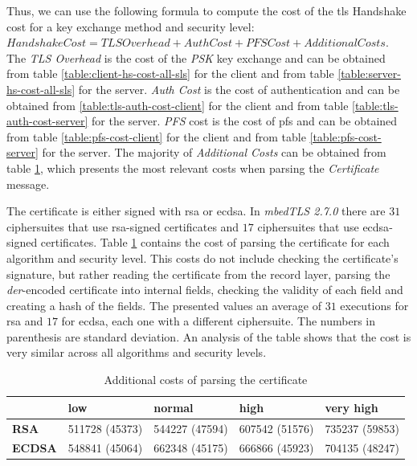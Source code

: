 \documentclass{llncs}
\begin{document}
Thus, we can use the following formula to compute the cost of the \gls{tls} Handshake cost for a key exchange method and
security level: $Handshake Cost = TLS Overhead + Auth Cost + PFS Cost + Additional Costs$. The \textit{TLS Overhead} is the cost of the
\textit{PSK} key exchange and can be obtained from table \ref{table:client-hs-cost-all-sls} for the client
and from table \ref{table:server-hs-cost-all-sls} for the server. \textit{Auth Cost} is the cost of authentication and can be obtained
from \ref{table:tls-auth-cost-client} for the client and from table \ref{table:tls-auth-cost-server} for the server. \textit{PFS} cost
is the cost of \gls{pfs} and can be obtained from table \ref{table:pfs-cost-client} for the client and from table \ref{table:pfs-cost-server}
for the server. The majority of \textit{Additional Costs} can be obtained from table \ref{table:cert-parse-cost}, which presents the most relevant
costs when parsing the \textit{Certificate} message.

The certificate is either signed with
\gls{rsa} or \gls{ecdsa}. In \textit{mbedTLS 2.7.0} there are $31$ ciphersuites that use \gls{rsa}-signed certificates and $17$ ciphersuites
that use \gls{ecdsa}-signed certificates. Table \ref{table:cert-parse-cost} contains the cost of parsing the certificate for each algorithm
and security level. This costs do not include checking the certificate's signature, but rather reading the certificate from the record layer,
parsing the \textit{der}-encoded certificate into internal fields, checking the validity of each field and creating a hash of the fields.
The presented values an average of $31$ executions for \gls{rsa} and $17$ for \gls{ecdsa}, each one with a
different ciphersuite. The numbers in parenthesis are standard deviation. An analysis of the table shows that the cost is very similar across all
algorithms and security levels.

\begin{table}[]
\begin{tabular}{|l|l|l|l|l|}
\hline
               & \textbf{low}   & \textbf{normal} & \textbf{high} & \textbf{very high} \\ \hline
\textbf{RSA}   & 511728 (45373) & 544227 (47594)  & 607542 (51576) & 735237 (59853)      \\ \hline
\textbf{ECDSA} & 548841 (45064) & 662348 (45175) & 666866 (45923)  & 704135 (48247)        \\ \hline
\end{tabular}
\centering \caption{ \label{table:cert-parse-cost} Additional costs of parsing the certificate}

\end{table}
\end{document}
